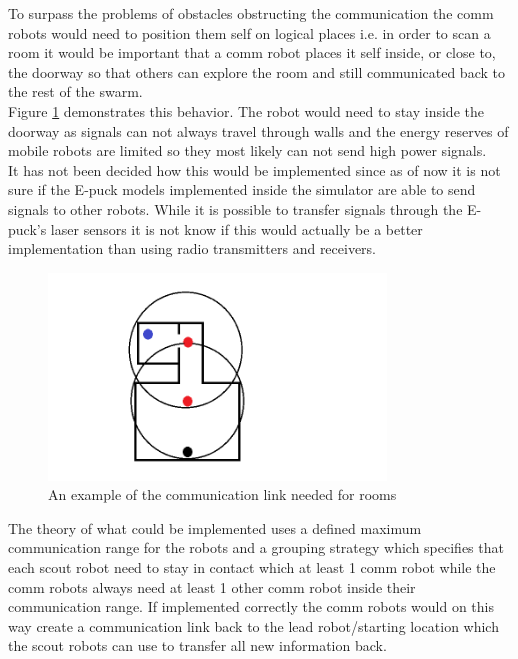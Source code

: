 To surpass the problems of obstacles obstructing the communication the comm robots would need to position them self on logical places i.e. in order to scan a room it would be important that a comm robot places it self inside, or close to, the doorway so that others can explore the room and still communicated back to the rest of the swarm. \\
Figure \ref{comm_example_room} demonstrates this behavior. The robot would need to stay inside the doorway as signals can not always travel through walls and the energy reserves of mobile robots are limited so they most likely can not send high power signals. \\
It has not been decided how this would be implemented since as of now it is not sure if the E-puck models implemented inside the simulator are able to send signals to other robots. While it is possible  to transfer signals through the E-puck's laser sensors it is not know if this would actually be a better implementation than using radio transmitters and receivers.\\[3ex]

\begin{figure}[h]
\centering
\includegraphics[width = 0.8\textwidth]{../../figures/comm_example_room.png} 
\caption{An example of the communication link needed for rooms}
\label{comm_example_room}
\end{figure}


The theory of what could be  implemented uses a defined maximum communication range for the robots and a grouping strategy which specifies that each scout robot need to stay in contact which at least 1 comm robot while the comm robots always need at least 1 other comm robot inside their communication range. If implemented correctly the comm robots would on this way create a communication link back to the lead robot/starting location which the scout robots can use to transfer all new information back.\\

